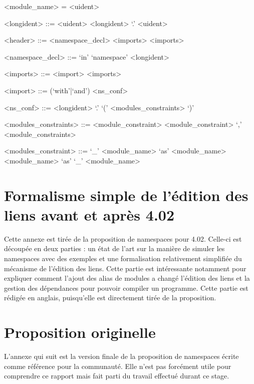 \documentclass[11pt,a4paper]{report}
\begin{document}
\begin{grammar}
<module_name> = <uident>

<longident> ::= <uident>
\alt <longident> `.' <uident>

<header> ::= <namespace_decl> <imports>
\alt <imports>

<namespace_decl> ::= `in' `namespace' <longident>

<imports> ::= <import> <imports> 

<import> ::= (`with'|`and') <ns_conf> 

<ns_conf> ::= <longident> `.' `(' <modules_constraints> `)'

<modules_constraints> ::= <module_constraint>
\alt <module_constraint> `,' <module_constraints>

<modules_constraint> ::= `_'
\alt <module_name> `as' <module_name>
\alt <module_name> `as' `_'
\alt <module_name>
\end{grammar}

\chapter{Formalisme simple de l'édition des liens avant et après 4.02}
\label{appendix-soa}

Cette annexe est tirée de la proposition de namespaces pour 4.02. Celle-ci est
découpée en deux parties : un état de l'art sur la manière de simuler les
namespaces avec des exemples et une formalisation relativement simplifiée du
mécanisme de l'édition des liens. Cette partie est intéressante notamment pour
expliquer comment l'ajout des alias de modules a changé l'édition des liens et
la gestion des dépendances pour pouvoir compiler un programme. Cette partie est
rédigée en anglais, puisqu'elle est directement tirée de la proposition.




\chapter{Proposition originelle}

L'annexe qui suit est la version finale de la proposition de namespaces écrite
comme référence pour la communauté. Elle n'est pas forcément utile pour
comprendre ce rapport mais fait parti du travail effectué durant ce stage.


\end{document}
